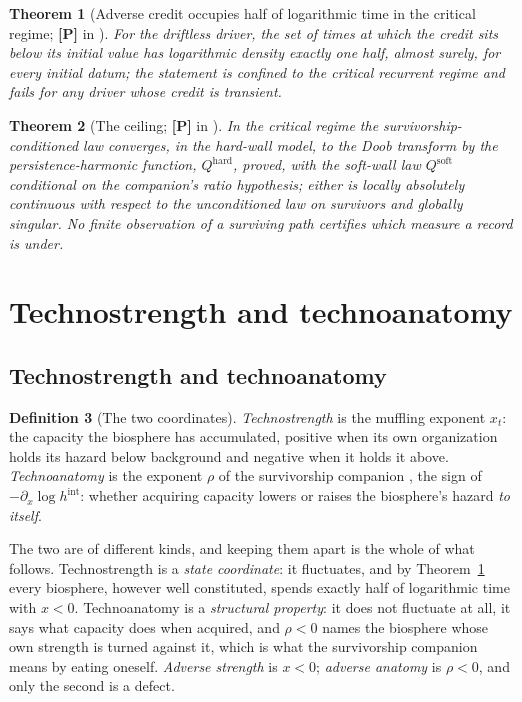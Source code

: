 \documentclass[11pt]{article}
\theoremstyle{plain}
\newtheorem{theorem}{Theorem}[section]
\theoremstyle{definition}
\newtheorem{definition}[theorem]{Definition}
\theoremstyle{remark}
\begin{document}
\begin{theorem}[Adverse credit occupies half of logarithmic time in the
critical regime; \textbf{[P]} in \cite{SurvA}]\label{imp:half}
For the driftless driver, the set of times at which the credit sits below
its initial value has logarithmic density exactly one half, almost
surely, for every initial datum; the statement is confined to the
critical recurrent regime and fails for any driver whose credit is
transient.
\end{theorem}

\begin{theorem}[The ceiling; \textbf{[P]} in \cite{SurvA}]\label{imp:ceiling}
In the critical regime the survivorship-conditioned law converges, in the
hard-wall model, to the Doob transform by the persistence-harmonic
function, $Q^{\mathrm{hard}}$, proved, with the soft-wall law
$Q^{\mathrm{soft}}$ conditional on the companion's ratio hypothesis;
either is locally absolutely continuous with respect to the
unconditioned law on survivors and globally singular. No finite observation of a surviving path certifies
which measure a record is under.
\end{theorem}

\section{Technostrength and technoanatomy}\label{sec:coords}

\subsection{Technostrength and technoanatomy}\label{gr:sub:coords}

\begin{definition}[The two coordinates]\label{gr:def:coords}
\emph{Technostrength} is the muffling exponent $x_t$: the capacity the
biosphere has accumulated, positive when its own organization holds its
hazard below background and negative when it holds it above.
\emph{Technoanatomy} is the exponent $\rho$ of
the survivorship companion \cite{SurvA}, the sign of
$-\partial_x\log h^{\mathrm{int}}$: whether acquiring capacity lowers or
raises the biosphere's hazard \emph{to itself}.

The two are of different kinds, and keeping them apart is the whole of
what follows. Technostrength is a \emph{state coordinate}: it
fluctuates, and by Theorem~\ref{imp:half} every biosphere, however well constituted, spends exactly half of logarithmic time
with $x<0$. Technoanatomy is a \emph{structural property}: it does not
fluctuate at all, it says what capacity does when acquired, and
$\rho<0$ names the biosphere whose own strength is turned against it,
which is what the survivorship companion \cite{SurvA} means by eating oneself.
\emph{Adverse strength} is $x<0$; \emph{adverse anatomy} is $\rho<0$,
and only the second is a defect.
\end{definition}
\end{document}
